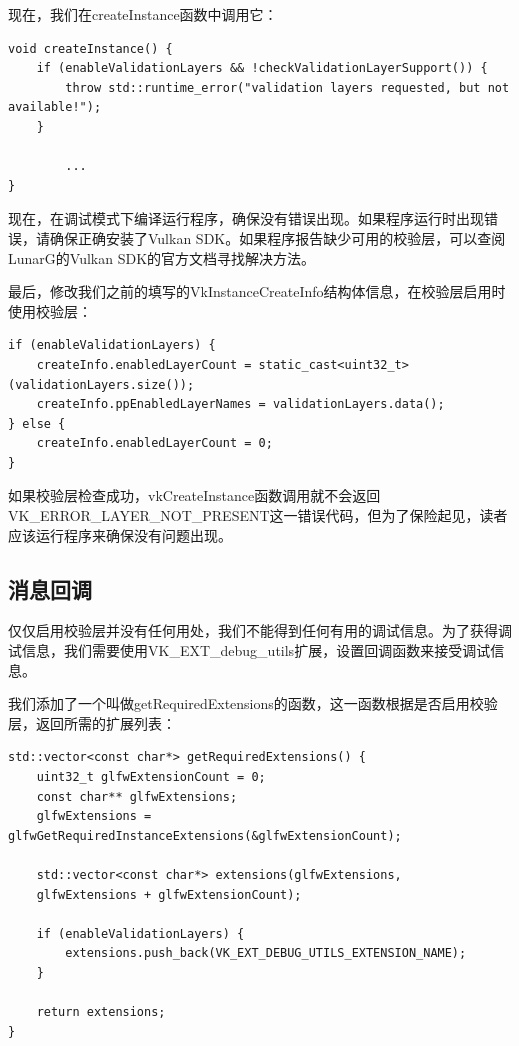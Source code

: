 \documentclass{ctexart}
\begin{document}
现在，我们在createInstance函数中调用它：

\begin{lstlisting}[language={[ANSI]C}]
void createInstance() {
	if (enableValidationLayers && !checkValidationLayerSupport()) {
		throw std::runtime_error("validation layers requested, but not available!");
	}

		...
}
\end{lstlisting}

现在，在调试模式下编译运行程序，确保没有错误出现。如果程序运行时出现错误，请确保正确安装了Vulkan SDK。如果程序报告缺少可用的校验层，可以查阅LunarG的Vulkan SDK的官方文档寻找解决方法。

最后，修改我们之前的填写的VkInstanceCreateInfo结构体信息，在校验层启用时使用校验层：

\begin{lstlisting}[language={[ANSI]C}]
if (enableValidationLayers) {
	createInfo.enabledLayerCount = static_cast<uint32_t>(validationLayers.size());
	createInfo.ppEnabledLayerNames = validationLayers.data();
} else {
	createInfo.enabledLayerCount = 0;
}
\end{lstlisting}

如果校验层检查成功，vkCreateInstance函数调用就不会返回VK\_ERROR\_LAYER\_NOT\_PRESENT这一错误代码，但为了保险起见，读者应该运行程序来确保没有问题出现。

\subsection{消息回调}

仅仅启用校验层并没有任何用处，我们不能得到任何有用的调试信息。为了获得调试信息，我们需要使用VK\_EXT\_debug\_utils扩展，设置回调函数来接受调试信息。

我们添加了一个叫做getRequiredExtensions的函数，这一函数根据是否启用校验层，返回所需的扩展列表：

\begin{lstlisting}[language={[ANSI]C}]
std::vector<const char*> getRequiredExtensions() {
	uint32_t glfwExtensionCount = 0;
	const char** glfwExtensions;
	glfwExtensions = glfwGetRequiredInstanceExtensions(&glfwExtensionCount);

	std::vector<const char*> extensions(glfwExtensions,
	glfwExtensions + glfwExtensionCount);

	if (enableValidationLayers) {
		extensions.push_back(VK_EXT_DEBUG_UTILS_EXTENSION_NAME);
	}

	return extensions;
}
\end{lstlisting}
\end{document}
